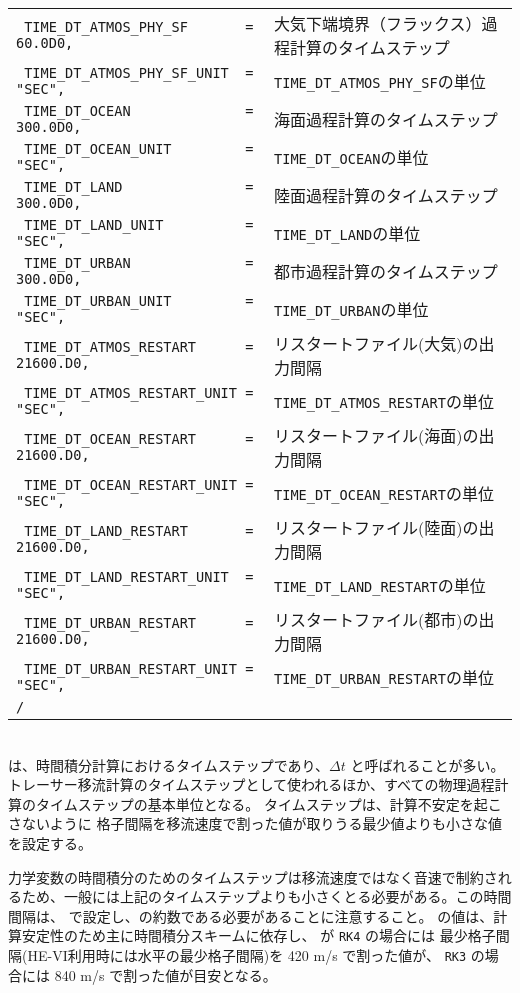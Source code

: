 {{{\begin{tabularx}{140mm}{lX}
\verb| TIME_DT_ATMOS_PHY_SF       = 60.0D0, | & 大気下端境界（フラックス）過程計算のタイムステップ\\
\verb| TIME_DT_ATMOS_PHY_SF_UNIT  = "SEC",  | & \verb|TIME_DT_ATMOS_PHY_SF|の単位\\
\verb| TIME_DT_OCEAN              = 300.0D0,| & 海面過程計算のタイムステップ\\
\verb| TIME_DT_OCEAN_UNIT         = "SEC",  | & \verb|TIME_DT_OCEAN|の単位\\
\verb| TIME_DT_LAND               = 300.0D0,| & 陸面過程計算のタイムステップ\\
\verb| TIME_DT_LAND_UNIT          = "SEC",  | & \verb|TIME_DT_LAND|の単位\\
\verb| TIME_DT_URBAN              = 300.0D0,| & 都市過程計算のタイムステップ\\
\verb| TIME_DT_URBAN_UNIT         = "SEC",  | & \verb|TIME_DT_URBAN|の単位\\
\verb| TIME_DT_ATMOS_RESTART      = 21600.D0, | & リスタートファイル(大気)の出力間隔\\
\verb| TIME_DT_ATMOS_RESTART_UNIT = "SEC",    | & \verb|TIME_DT_ATMOS_RESTART|の単位\\
\verb| TIME_DT_OCEAN_RESTART      = 21600.D0, | & リスタートファイル(海面)の出力間隔\\
\verb| TIME_DT_OCEAN_RESTART_UNIT = "SEC",    | & \verb|TIME_DT_OCEAN_RESTART|の単位\\
\verb| TIME_DT_LAND_RESTART       = 21600.D0, | & リスタートファイル(陸面)の出力間隔\\
\verb| TIME_DT_LAND_RESTART_UNIT  = "SEC",    | & \verb|TIME_DT_LAND_RESTART|の単位\\
\verb| TIME_DT_URBAN_RESTART      = 21600.D0, | & リスタートファイル(都市)の出力間隔\\
\verb| TIME_DT_URBAN_RESTART_UNIT = "SEC",    | & \verb|TIME_DT_URBAN_RESTART|の単位\\
\verb|/|\\
\end{tabularx}
}}}\\


 は、時間積分計算におけるタイムステップであり、$\Delta t$ と呼ばれることが多い。
トレーサー移流計算のタイムステップとして使われるほか、すべての物理過程計算のタイムステップの基本単位となる。
タイムステップは、計算不安定を起こさないように
格子間隔を移流速度で割った値が取りうる最少値よりも小さな値を設定する。

力学変数の時間積分のためのタイムステップは移流速度ではなく音速で制約されるため、一般には上記のタイムステップよりも小さくとる必要がある。この時間間隔は、 で設定し、の約数である必要があることに注意すること。
の値は、計算安定性のため主に時間積分スキームに依存し、
 が \verb|RK4| の場合には
最少格子間隔(HE-VI利用時には水平の最少格子間隔)を 420 m/s で割った値が、
\verb|RK3| の場合には 840 m/s で割った値が目安となる。

